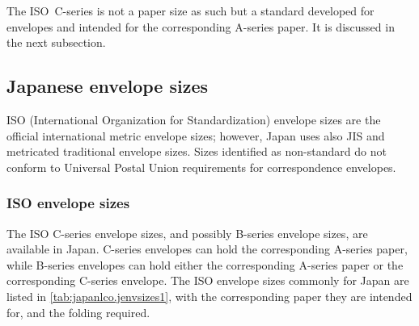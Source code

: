 The ISO~C-series is not a paper size as such but a standard developed for
envelopes and intended for the corresponding A-series paper. It is discussed
in the next subsection.

\subsection{Japanese envelope sizes}

ISO (International Organization for Standardization) envelope sizes are the
official international metric envelope sizes; however, Japan uses also JIS and
metricated traditional envelope sizes. Sizes identified as non-standard do not
conform to Universal Postal Union requirements for correspondence envelopes.

\subsubsection{ISO envelope sizes}
The ISO C-series envelope sizes, and possibly B-series envelope sizes, are
available in Japan. C-series envelopes can hold the corresponding A-series
paper, while B-series envelopes can hold either the corresponding A-series
paper or the corresponding C-series envelope. The ISO envelope sizes commonly
for Japan are listed in \autoref{tab:japanlco.jenvsizes1}, with the
corresponding paper they are intended for, and the folding required.


